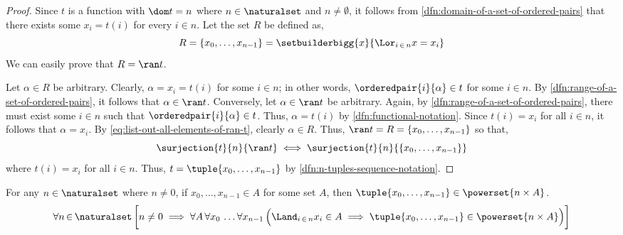 \begin{proof}
    Since \( t \) is a function with \( \dom t = n \) where \( n \in \naturalset \) and \( n \neq \emptyset \),
    it follows from \cref{dfn:domain-of-a-set-of-ordered-pairs} that there exists some \( x_{i} = t(i) \) for
    every \( i \in n \). Let the set \( R \) be defined as,
    \begin{equation}
        \label{eq:list-out-all-elements-of-ran-t}
        R = \mleft\{ x_{0},\dots,x_{n-1} \mright\} = \setbuilderbigg{x}{\Lor_{i \,\in\, n} x = x_{i}}
    \end{equation}
    We can easily prove that \( R = \ran t \).

    \vspace{0.2cm}
    \noindent
    Let \( \alpha \in R \) be arbitrary. Clearly, \( \alpha = x_{i} = t(i) \) for some \( i \in n \); in other words,
    \( \orderedpair{i}{\alpha} \in t \) for some \( i \in n \). By \cref{dfn:range-of-a-set-of-ordered-pairs}, it
    follows that \( \alpha \in \ran t \). Conversely, let \( \alpha \in \ran t \) be arbitrary.
    Again, by \cref{dfn:range-of-a-set-of-ordered-pairs}, there must exist some \( i \in n \) such that
    \( \orderedpair{i}{\alpha} \in t \). Thus, \( \alpha = t(i) \) by \cref{dfn:functional-notation}.
    Since \( t(i) = x_{i} \) for all \( i \in n \), it follows that \( \alpha = x_{i} \).
    By \eqref{eq:list-out-all-elements-of-ran-t}, clearly \( \alpha \in R \).
    Thus, \( \ran t = R = \mleft\{ x_{0},\dots,x_{n-1} \mright\} \) so that,
    \begin{equation*}
        \surjection{t}{n}{\ran t} \iff \surjection{t}{n}{\mleft\{ x_{0},\dots,x_{n-1} \mright\}}
    \end{equation*}
    where \( t(i) = x_{i} \) for all \( i \in n \). Thus, \( t = \tuple{x_{0}, \dots, x_{n-1}} \) by \cref{dfn:n-tuples-sequence-notation}.
\end{proof}

\begin{thm}
    \label{thm:if-every-coordinate-of-an-n-tuple-belongs-to-A-then-the-n-tuple-belongs-to-the-power-set-of-the-cartesian-product-between-n-and-A}
    For any \( n \in \naturalset \) where \( n \neq 0 \),
    if \( x_{0},\dots,x_{n-1} \in A \) for some set \( A \), then \( \tuple{x_{0},\dots,x_{n-1}} \in \powerset{n \times A} \).
    \begin{equation*}
        \forall n\,{\in}\,\naturalset \,
        \bigg[ n \neq 0 \implies
        \forall A \, \forall x_{0} \, \dots \forall x_{n-1} \, \Big( \Land_{i \,\in\, n} x_{i} \in A \implies \tuple{x_{0}, \dots, x_{n-1}} \in \powerset{n \times A} \Big)
        \bigg]
    \end{equation*}
\end{thm}

